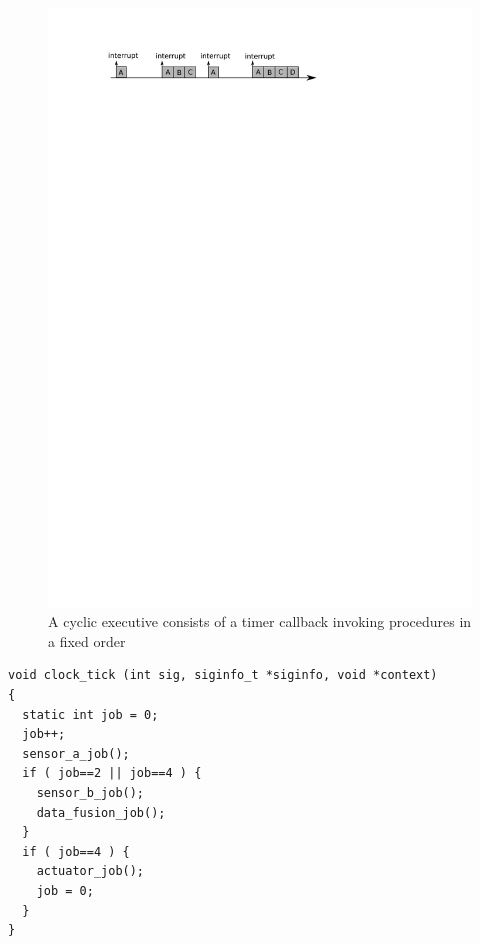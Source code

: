 \begin{figure}
\centering
\includegraphics{figs/cyclic_exec}
\caption{A cyclic executive consists of a timer callback invoking
  procedures in a fixed order}
\label{fig:cyclic_exec}
\end{figure} 

\begin{minipage}{\listingwidth}
\lstset{language=c}
\begin{lstlisting}[label=lst:cyclic_callback, caption=The timer callback
    for a cyclic executive running four separate harmonic tasks]
void clock_tick (int sig, siginfo_t *siginfo, void *context)
{
  static int job = 0;
  job++;
  sensor_a_job();
  if ( job==2 || job==4 ) {
    sensor_b_job();
    data_fusion_job();
  }
  if ( job==4 ) {
    actuator_job();
    job = 0;
  }
}
\end{lstlisting}
\end{minipage}

